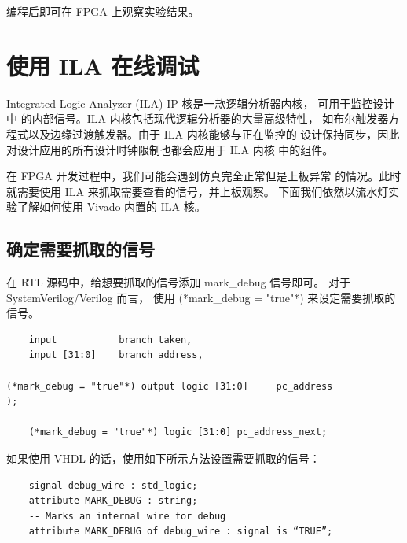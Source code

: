 \documentclass[ichigo,normal,cn]{elegantnote_mod}
\begin{document}
编程后即可在 FPGA 上观察实验结果。

\section{使用 ILA 在线调试}

\begin{center}
\end{center}

Integrated Logic Analyzer (ILA) IP 核是一款逻辑分析器内核，
可用于监控设计中 的内部信号。ILA 内核包括现代逻辑分析器的大量高级特性，
如布尔触发器方程式以及边缘过渡触发器。由于 ILA 内核能够与正在监控的
设计保持同步，因此对设计应用的所有设计时钟限制也都会应用于 ILA 内核
中的组件。 

在 FPGA 开发过程中，我们可能会遇到仿真完全正常但是上板异常
的情况。此时就需要使用 ILA 来抓取需要查看的信号，并上板观察。 
下面我们依然以流水灯实验了解如何使用 Vivado 内置的 ILA 核。

\subsection{确定需要抓取的信号}

在 RTL 源码中，给想要抓取的信号添加 mark\_debug 信号即可。 
对于 SystemVerilog/Verilog 而言，
使用 (*mark\_debug = "true"*) 来设定需要抓取的信号。
\begin{lstlisting}
    input           branch_taken,
    input [31:0]    branch_address, 
 
(*mark_debug = "true"*) output logic [31:0]     pc_address
); 
 
    (*mark_debug = "true"*) logic [31:0] pc_address_next;
\end{lstlisting}
如果使用 VHDL 的话，使用如下所示方法设置需要抓取的信号： 
\begin{lstlisting}
    signal debug_wire : std_logic;
    attribute MARK_DEBUG : string; 
    -- Marks an internal wire for debug 
    attribute MARK_DEBUG of debug_wire : signal is “TRUE”; 
\end{lstlisting}
\end{document}
